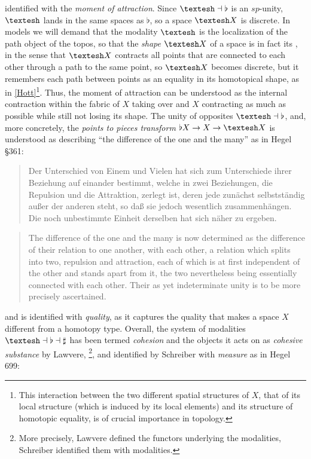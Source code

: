 \documentclass{article}
\begin{document}
identified with the \emph{moment of attraction}. Since $\textrm{\textesh}\dashv\flat$ is an $sp$-unity, 
$\textrm{\textesh}$ lands in the same spaces as $\flat$, so a space $\textrm{\textesh} X$ is discrete. In 
models we will demand that the modality 
$\textrm{\textesh}$ is the localization of the path object of the topos, so that the \emph{shape} 
$\textrm{\textesh} X$ of a space is in fact its , in the sense that $\textrm{\textesh} X$ 
contracts all points that are connected to each other through a path to the same point, so $\textrm{\textesh}
X$ becomes discrete, but it remembers each path between points as an equality in its homotopical shape, as in
\ref{Hott}\footnote{This interaction between the two different spatial structures of $X$,
that of its local structure (which is induced by its local elements) and its structure of homotopic equality,
is of crucial importance in topology.}. Thus, the moment of attraction can be understood as the internal
contraction within the fabric of $X$ taking over and $X$ contracting as much as possible while still not
losing its shape. The unity of opposites $\textrm{\textesh}\dashv\flat$, and, more concretely, the
\emph{points to pieces transform} $\flat X\rightarrow X\rightarrow \textrm{\textesh} X$ is understood as
describing ``the difference of the one and the many'' as in Hegel §361:

\begin{quote}
    Der Unterschied von Einem und Vielen hat sich zum Unterschiede ihrer Beziehung auf einander bestimmt, welche in zwei Beziehungen, die Repulsion und die Attraktion, zerlegt ist, deren jede zunächst selbstständig außer der anderen steht, so daß sie jedoch wesentlich zusammenhängen. Die noch unbestimmte Einheit derselben hat sich näher zu ergeben.
\end{quote}
    
\begin{quote}
    The difference of the one and the many is now determined as the difference of their relation to one another, with each other, a relation which splits into two, repulsion and attraction, each of which is at first independent of the other and stands apart from it, the two nevertheless being essentially connected with each other. Their as yet indeterminate unity is to be more precisely ascertained.
\end{quote}

and is identified with \emph{quality}, as it captures the quality that makes a space $X$ different from a
homotopy type. Overall, the system of modalities $\textrm{\textesh}\dashv\flat\dashv\sharp$ has been termed
\emph{cohesion} and the objects it acts on as \emph{cohesive substance} by Lawvere, \cite{Coh}\footnote{More
precisely, Lawvere defined the functors underlying the modalities, Schreiber identified them with
modalities.}, and identified by Schreiber with \emph{measure} as in Hegel 699:
\end{document}
